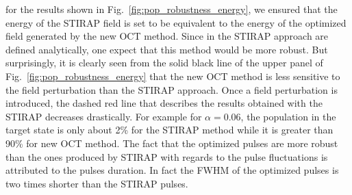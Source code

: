 \documentclass[]{interact}
\theoremstyle{plain}%
\theoremstyle{definition}
\theoremstyle{remark}
\begin{document}
for the results shown in Fig.~\ref{fig:pop_robustness_energy}, we ensured that 
the energy of the STIRAP field is set to be equivalent to the energy of the 
optimized field generated by the new OCT method.  
Since in the STIRAP approach are defined analytically, one expect that 
this method would be more robust. But surprisingly, it is clearly seen from the 
solid black line of the upper panel of 
Fig.~\ref{fig:pop_robustness_energy} that the new OCT method is less 
sensitive to the field perturbation than the STIRAP approach.  
Once a field perturbation is introduced, the dashed red line that describes the 
results obtained with the STIRAP decreases drastically. For example for 
$\alpha=0.06$, the population in the target state is only about 2\% for the 
STIRAP method while it is greater than 90\% for new OCT method. The fact that 
the optimized pulses are more robust than the ones produced by STIRAP with 
regards to the pulse fluctuations is attributed to the pulses duration. In fact 
the FWHM of the optimized pulses is two times shorter than the STIRAP pulses. 
\end{document}
